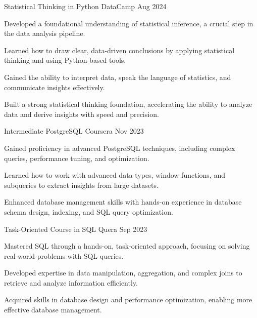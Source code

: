 \begin{cventries}
	
	\cventry
	{Statistical Thinking in Python} %
	{DataCamp} %
	{\textcolor{neutraltext}{Aug 2024}} %
	{} %
	{
		\begin{cvitems} %
			\item Developed a foundational understanding of statistical inference, a crucial step in the data analysis pipeline.
			\item Learned how to draw clear, data-driven conclusions by applying statistical thinking and using Python-based tools.
			\item Gained the ability to interpret data, speak the language of statistics, and communicate insights effectively.
			\item Built a strong statistical thinking foundation, accelerating the ability to analyze data and derive insights with speed and precision.
		\end{cvitems}
	}
	
	
	\cventry
	{Intermediate PostgreSQL} %
	{Coursera} %
	{\textcolor{neutraltext}{Nov 2023}} %
	{} %
	{
		\begin{cvitems} %
			\item Gained proficiency in advanced PostgreSQL techniques, including complex queries, performance tuning, and optimization.
			\item Learned how to work with advanced data types, window functions, and subqueries to extract insights from large datasets.
			\item Enhanced database management skills with hands-on experience in database schema design, indexing, and SQL query optimization.
		\end{cvitems}
	}
	
		
	\cventry
	{Task-Oriented Course in SQL} %
	{Quera} %
	{\textcolor{neutraltext}{Sep 2023}} %
	{} %
	{
		\begin{cvitems} %
			\item Mastered SQL through a hands-on, task-oriented approach, focusing on solving real-world problems with SQL queries.
			\item Developed expertise in data manipulation, aggregation, and complex joins to retrieve and analyze information efficiently.
			\item Acquired skills in database design and performance optimization, enabling more effective database management.
		\end{cvitems}
	}
	

\end{cventries}
